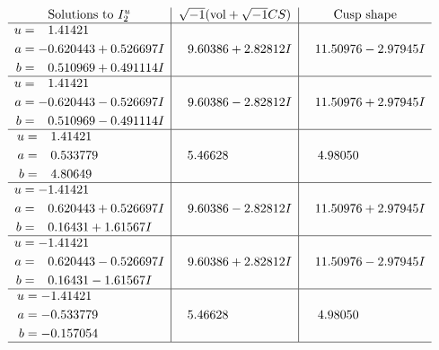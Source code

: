 \documentclass[1p]{elsarticle_modified}
\theoremstyle{definition}
\newcommand{\I}{\sqrt{-1}}
\begin{document}
$$\begin{array}{c|c|c}  
\text{Solutions to }I^u_{2}& \I (\text{vol} + \sqrt{-1}CS) & \text{Cusp shape}\\
 \hline 
\begin{aligned}
u &= \phantom{-}1.41421\phantom{ +0.000000I} \\
a &= -0.620443 + 0.526697 I \\
b &= \phantom{-}0.510969 + 0.491114 I\end{aligned}
 & \phantom{-}9.60386 + 2.82812 I & \phantom{-}11.50976 - 2.97945 I \\ \hline\begin{aligned}
u &= \phantom{-}1.41421\phantom{ +0.000000I} \\
a &= -0.620443 - 0.526697 I \\
b &= \phantom{-}0.510969 - 0.491114 I\end{aligned}
 & \phantom{-}9.60386 - 2.82812 I & \phantom{-}11.50976 + 2.97945 I \\ \hline\begin{aligned}
u &= \phantom{-}1.41421\phantom{ +0.000000I} \\
a &= \phantom{-}0.533779\phantom{ +0.000000I} \\
b &= \phantom{-}4.80649\phantom{ +0.000000I}\end{aligned}
 & \phantom{-}5.46628\phantom{ +0.000000I} & \phantom{-}4.98050\phantom{ +0.000000I} \\ \hline\begin{aligned}
u &= -1.41421\phantom{ +0.000000I} \\
a &= \phantom{-}0.620443 + 0.526697 I \\
b &= \phantom{-}0.16431 + 1.61567 I\end{aligned}
 & \phantom{-}9.60386 - 2.82812 I & \phantom{-}11.50976 + 2.97945 I \\ \hline\begin{aligned}
u &= -1.41421\phantom{ +0.000000I} \\
a &= \phantom{-}0.620443 - 0.526697 I \\
b &= \phantom{-}0.16431 - 1.61567 I\end{aligned}
 & \phantom{-}9.60386 + 2.82812 I & \phantom{-}11.50976 - 2.97945 I \\ \hline\begin{aligned}
u &= -1.41421\phantom{ +0.000000I} \\
a &= -0.533779\phantom{ +0.000000I} \\
b &= -0.157054\phantom{ +0.000000I}\end{aligned}
 & \phantom{-}5.46628\phantom{ +0.000000I} & \phantom{-}4.98050\phantom{ +0.000000I}\\
 \hline 
 \end{array}$$\newpage\newpage\renewcommand{\arraystretch}{1}
\end{document}
